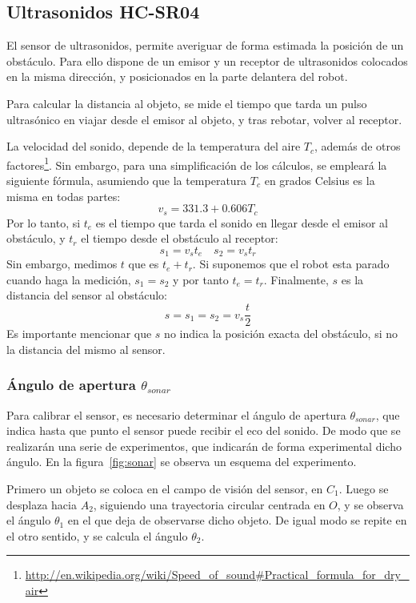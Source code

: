 \documentclass[10pt,a4paper,hidelinks]{article}
\begin{document}
\begin{multicols}{2}
\subsection{Ultrasonidos HC-SR04}

El sensor de ultrasonidos, permite averiguar de forma estimada la posición de un
obstáculo. Para ello dispone de un emisor y un receptor de ultrasonidos
colocados en la misma dirección, y posicionados en la parte delantera del robot.

Para calcular la distancia al objeto, se mide el tiempo que tarda un pulso
ultrasónico en viajar desde el emisor al objeto, y tras rebotar, volver al
receptor.

La velocidad del sonido, depende de la temperatura del aire $T_c$, además
de otros
factores\footnote{\url{http://en.wikipedia.org/wiki/Speed\_of\_sound\#Practical\_formula\_for\_dry\_air}}.
Sin embargo, para una simplificación de los cálculos, se empleará la siguiente
fórmula, asumiendo que la temperatura $T_c$ en grados Celsius es la misma en 
todas partes:
$$ v_{s} = 331.3 + 0.606T_c $$
Por lo tanto, si $t_e$ es el tiempo que tarda el sonido en llegar desde el 
emisor al obstáculo, y $t_r$ el tiempo desde el obstáculo al receptor:
$$ s_1 = v_{s} t_e \quad s_2 = v_{s} t_r $$
Sin embargo, medimos $t$ que es $t_e+t_r$. Si suponemos que el robot esta parado 
cuando haga la medición, $s_1 = s_2$ y por tanto $t_e = t_r$. Finalmente, $s$ es 
la distancia del sensor al obstáculo:
\begin{equation}
	s = s_1 = s_2 = v_{s}\frac{t}{2}\label{eq:velocidad-sonido}
\end{equation}
Es importante mencionar que $s$ no indica la posición exacta del obstáculo, si 
no la distancia del mismo al sensor.

\subsubsection{Ángulo de apertura $\theta_{sonar}$}
Para calibrar el sensor, es necesario determinar el ángulo de apertura 
$\theta_{sonar}$, que indica hasta que punto el sensor puede recibir el eco del 
sonido. De modo que se realizarán una serie de experimentos, que indicarán de 
forma experimental dicho ángulo. En la figura~\ref{fig:sonar} se observa un
esquema del experimento.

Primero un objeto se coloca en el campo de visión del sensor, en $C_1$. Luego se 
desplaza hacia $A_2$, siguiendo una trayectoria circular centrada en $O$, y se 
observa el ángulo $\theta_1$ en el que deja de observarse dicho objeto. De igual 
modo se repite en el otro sentido, y se calcula el ángulo $\theta_{2}$.


\end{multicols}
\end{document}
